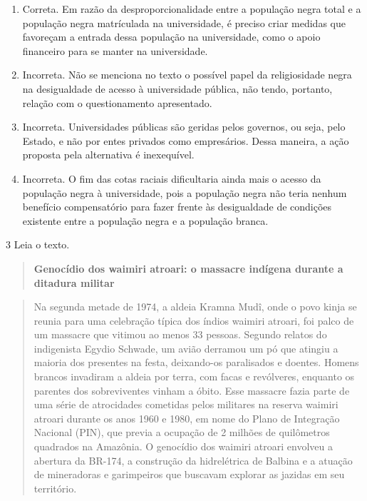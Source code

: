 \begin{enumerate}
\def\labelenumi{\alph{enumi})}
\item
  Correta. Em razão da desproporcionalidade entre a população negra
  total e a população negra matrículada na universidade, é preciso criar
  medidas que favoreçam a entrada dessa população na universidade, como
  o apoio financeiro para se manter na universidade.
\item
  Incorreta. Não se menciona no texto o possível papel da religiosidade
  negra na desigualdade de acesso à universidade pública, não tendo,
  portanto, relação com o questionamento apresentado.
\item
  Incorreta. Universidades públicas são geridas pelos governos, ou seja,
  pelo Estado, e não por entes privados como empresários. Dessa maneira,
  a ação proposta pela alternativa é inexequível.
\item
  Incorreta. O fim das cotas raciais dificultaria ainda mais o acesso da
  população negra à universidade, pois a população negra não teria
  nenhum benefício compensatório para fazer frente às desigualdade de
  condições existente entre a população negra e a população branca.
\end{enumerate}

\num{3} Leia o texto.

\begin{quote}
\textbf{Genocídio dos waimiri atroari: o massacre indígena durante a ditadura militar}
\end{quote}

\begin{quote}
Na segunda metade de 1974, a aldeia Kramna Mudî, onde o povo kinja se
reunia para uma celebração típica dos índios waimiri atroari, foi palco
de um massacre que vitimou ao menos 33 pessoas. Segundo relatos do
indigenista Egydio Schwade, um avião derramou um pó que atingiu a
maioria dos presentes na festa, deixando-os paralisados e doentes.
Homens brancos invadiram a aldeia por terra, com facas e revólveres,
enquanto os parentes dos sobreviventes vinham a óbito. Esse massacre
fazia parte de uma série de atrocidades cometidas pelos militares na
reserva waimiri atroari durante os anos 1960 e 1980, em nome do Plano de
Integração Nacional (PIN), que previa a ocupação de 2 milhões de
quilômetros quadrados na Amazônia. O genocídio dos waimiri atroari
envolveu a abertura da BR-174, a construção da hidrelétrica de Balbina e
a atuação de mineradoras e garimpeiros que buscavam explorar as jazidas
em seu território.
\end{quote}

